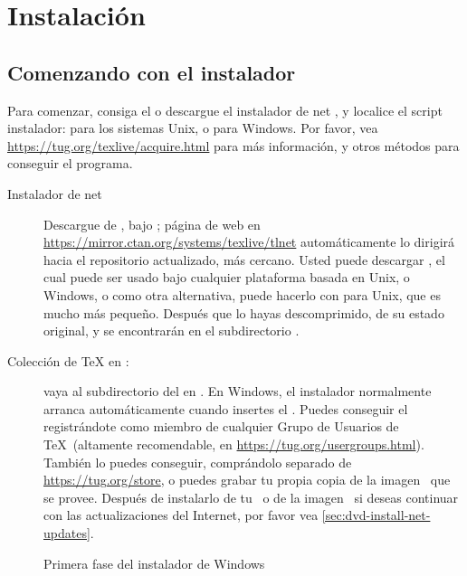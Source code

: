 \documentclass{article}
\begin{document}
\section{Instalación}
\label{sec:install}

\subsection{Comenzando con el instalador}
\label{sec:inst-start}

Para comenzar, consiga el \TK{} \DVD{} o descargue el instalador de
net \TL{}, y localice el script instalador:  para
los sistemas Unix, o  para Windows. Por
favor, vea
\url{https://tug.org/texlive/acquire.html} para más información, y
otros métodos para conseguir el programa.

\begin{description}
	\item [Instalador de net] Descargue de \CTAN{}, bajo
		; página de web en
		\url{https://mirror.ctan.org/systems/texlive/tlnet}
		automáticamente lo dirigirá hacia el repositorio
		actualizado, más cercano. Usted puede  descargar
		, el cual puede ser usado
		bajo cualquier plataforma basada en Unix, o Windows, o
		como otra alternativa, puede hacerlo con
		 para Unix, que es mucho
		más pequeño. Después que lo hayas descomprimido, de
		su estado original,  y
		 se encontrarán en el
		subdirectorio .

\item [Colección de \TeX{} en \DVD:] vaya al subdirectorio del \DVD en
	. En Windows, el instalador normalmente
	arranca automáticamente cuando insertes el \DVD. Puedes
	conseguir el \DVD\, registrándote como miembro de cualquier
	Grupo de Usuarios de \TeX\ (altamente recomendable, en
	\url{https://tug.org/usergroups.html}). También lo puedes
	conseguir, comprándolo separado de \url{https://tug.org/store},
	o puedes grabar tu propia copia de la imagen \ISO\ que se
	provee. Después de instalarlo de tu \DVD\, o de la imagen
	\ISO\, si deseas continuar con las actualizaciones del
	Internet, por favor vea \ref{sec:dvd-install-net-updates}.

\end{description}

\begin{figure}[tb]
\caption{Primera fase del instalador de Windows  }\label{fig:nsis}
\end{figure}
\end{document}
